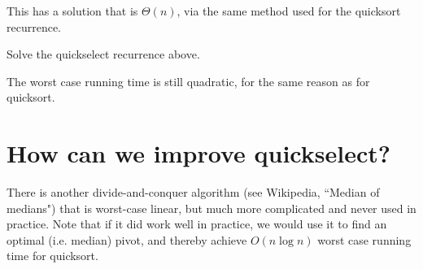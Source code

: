 This has a solution that is $\Theta(n)$, via the same method used for the quicksort recurrence.

\begin{Boxample}[6]
Solve the quickselect recurrence above.
\end{Boxample}

The worst case running time is still quadratic, for the same reason as for quicksort.

\section{How can we improve quickselect?}
There is another divide-and-conquer algorithm (see Wikipedia, ``Median of medians") that is worst-case linear, 
but much more complicated and never used in practice. 
Note that if it did work well in practice, we would use it to find an optimal (i.e. median) pivot, 
and thereby achieve $O(n\log n)$ worst case running time for quicksort.



